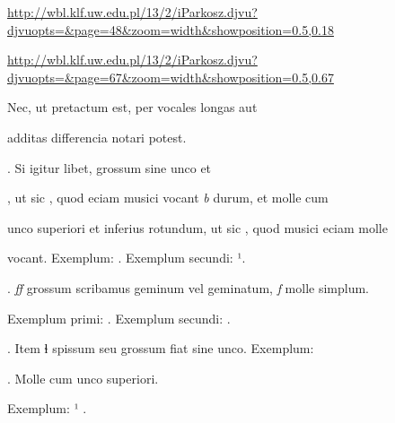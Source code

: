 
{
\url{http://wbl.klf.uw.edu.pl/13/2/iParkosz.djvu?djvuopts=&page=48&zoom=width&showposition=0.5,0.18}

\url{http://wbl.klf.uw.edu.pl/13/2/iParkosz.djvu?djvuopts=&page=67&zoom=width&showposition=0.5,0.67}
}

\bigskip

\obeylines
\mono


\fullpreviouslines


{
\color{blue}
Nec, ut pretactum est, per vocales longas aut

}



\splitlines

additas differencia notari potest.

\indentP {}. Si igitur libet,   grossum sine unco et 

\fulllines

, ut sic , quod eciam musici vocant \textit{b} durum, et  molle cum 

unco superiori et inferius rotundum, ut sic , quod musici eciam  molle 


vocant. Exemplum:   . Exemplum secundi:   ¹. 

. \textit{ﬀ} grossum scribamus geminum vel geminatum, \textit{f} molle simplum. 

Exemplum primi:   . Exemplum secundi:  . 

. Item ɬ spissum seu grossum fiat sine unco. Exemplum:   

    . Molle cum unco superiori. 


\splitlines
Exemplum:    ¹  .

